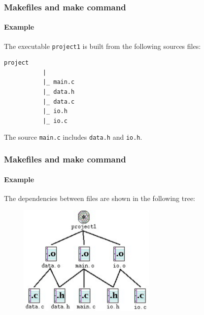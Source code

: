 \documentclass[11pt]{beamer}
\begin{document}

\lstset{%
     showstringspaces = false,
     basicstyle=\small\ttfamily,
   }

\begin{frame}[t,fragile]
  \frametitle{Makefiles and make command}
  \framesubtitle{Example}

  The executable \texttt{project1} is built from the following sources files:

  \vspace{5mm}
  \begin{lstlisting}[language=make]
         project
           |
           |_ main.c
           |_ data.h
           |_ data.c
           |_ io.h
           |_ io.c
  \end{lstlisting}

  \vspace{5mm}
  The source \texttt{main.c} includes \texttt{data.h} and
  \texttt{io.h}.

\end{frame}


\begin{frame}
  \frametitle{Makefiles and make command}
  \framesubtitle{Example}

  The dependencies between files are shown in the following tree:

  \begin{figure}[!htb]
    \centering
    \includegraphics[width=0.6\textwidth]{dep_graph}
  \end{figure}

\end{frame}

\end{document}
